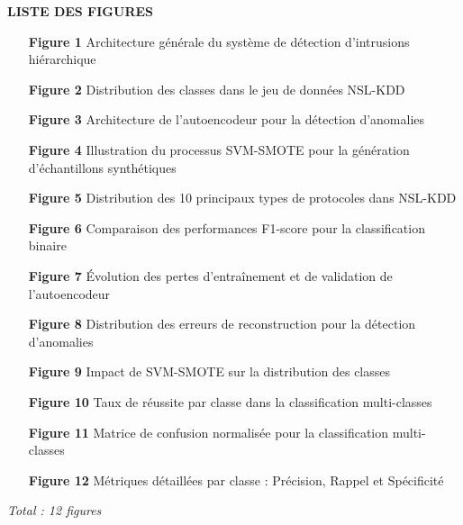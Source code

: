 
\newpage
\thispagestyle{empty}

\begin{center}
    \vspace{2cm}
    {\Large \textbf{\color{blueuniv}LISTE DES FIGURES}}
    \vspace{1cm}
\end{center}

\begin{enumerate}
    \item[\textbf{Figure 1}] Architecture générale du système de détection d'intrusions hiérarchique \dotfill \pageref{fig:pipeline_general}
    
    \item[\textbf{Figure 2}] Distribution des classes dans le jeu de données NSL-KDD \dotfill \pageref{fig:data_distribution}
    
    \item[\textbf{Figure 3}] Architecture de l'autoencodeur pour la détection d'anomalies \dotfill \pageref{fig:autoencoder}
    
    \item[\textbf{Figure 4}] Illustration du processus SVM-SMOTE pour la génération d'échantillons synthétiques \dotfill \pageref{fig:smote}
    
    \item[\textbf{Figure 5}] Distribution des 10 principaux types de protocoles dans NSL-KDD \dotfill \pageref{fig:protocol_dist}
    
    \item[\textbf{Figure 6}] Comparaison des performances F1-score pour la classification binaire \dotfill \pageref{fig:binary_perf}
    
    \item[\textbf{Figure 7}] Évolution des pertes d'entraînement et de validation de l'autoencodeur \dotfill \pageref{fig:ae_training}
    
    \item[\textbf{Figure 8}] Distribution des erreurs de reconstruction pour la détection d'anomalies \dotfill \pageref{fig:reconstruction_dist}
    
    \item[\textbf{Figure 9}] Impact de SVM-SMOTE sur la distribution des classes \dotfill \pageref{fig:smote_impact}
    
    \item[\textbf{Figure 10}] Taux de réussite par classe dans la classification multi-classes \dotfill \pageref{fig:class_perf}
    
    \item[\textbf{Figure 11}] Matrice de confusion normalisée pour la classification multi-classes \dotfill \pageref{fig:confusion_matrix}
    
    \item[\textbf{Figure 12}] Métriques détaillées par classe : Précision, Rappel et Spécificité \dotfill \pageref{fig:detailed_metrics}
    
\end{enumerate}

\vfill

\begin{center}
    \textit{Total : 12 figures}
\end{center}

\newpage